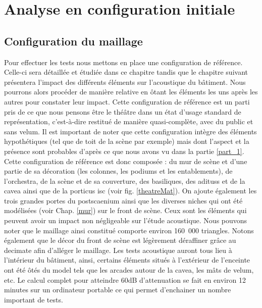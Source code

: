 	
\chapter{Analyse en configuration initiale}
	\minitoc
	\newpage
	

	\section{Configuration du maillage}
Pour effectuer les tests nous mettons en place une configuration de référence. Celle-ci sera détaillée et étudiée dans ce chapitre tandis que le chapitre suivant présentera l'impact des différents éléments sur l'acoustique du bâtiment. Nous pourrons alors procéder de manière relative en ôtant les éléments les uns après les autres pour constater leur impact. Cette configuration de référence est un parti pris de ce que nous pensons être le théâtre dans un état d'usage standard de représentation, c'est-à-dire restitué de manière quasi-complète, avec du public et sans \gls{velum}. Il est important de noter que cette configuration intègre des éléments hypothétiques (tel que de toit de la scène par exemple) mais dont l'aspect et la présence sont probables d'après ce que nous avons vu dans la partie \ref{part_1}. Cette configuration de référence est donc composée : du mur de scène et d'une partie de sa décoration (les colonnes, les \glspl{podium} et les entablements), de l'\gls{orchestra}, de la scène et de sa couverture, des basiliques, des \glspl{aditus} et de la \gls{cavea} ainsi que de la \gls{porticus isc} (voir fig. \ref{theatreMat}). On ajoute également les trois grandes portes du \gls{postscaenium} ainsi que les diverses niches qui ont été modélisées (voir Chap. \ref{mur}) sur le front de scène. Ceux sont les éléments qui peuvent avoir un impact non négligeable sur l'étude acoustique. Nous pouvons noter que le maillage ainsi constitué comporte environ 160~000 triangles. Notons également que le décor du front de scène est légèrement déraffiner grâce au \gls{decimate} afin d'alléger le maillage. Les tests acoustique auront tous lieu à l'intérieur du bâtiment, ainsi, certains éléments situés à l'extérieur de l'enceinte ont été ôtés du model tels que les arcades autour de la \gls{cavea}, les mâts de \gls{velum}, etc. Le calcul complet pour atteindre 60dB d'attenuation se fait en environ 12 minutes sur un ordinateur portable ce qui permet d'enchainer un nombre important de tests.

